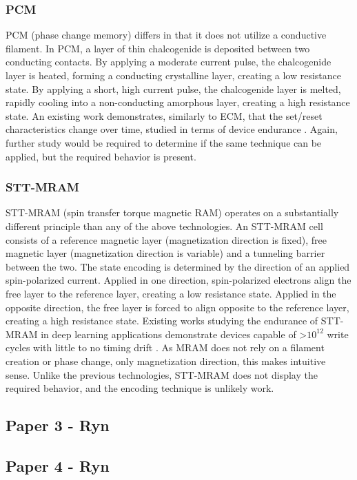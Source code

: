 \documentclass[sigconf,authoryear]{acmart}
\begin{document}
\subsubsection{PCM}
PCM (phase change memory) differs in that it does not utilize a conductive filament. In PCM, a layer of thin chalcogenide is deposited 
between two conducting contacts. By applying a moderate current pulse, the chalcogenide layer is heated, forming a conducting 
crystalline layer, creating a low resistance state. By applying a short, high current pulse, the chalcogenide layer is melted, 
rapidly cooling into a non-conducting amorphous layer, creating a high resistance state. An existing work demonstrates, similarly to ECM, 
that the set/reset characteristics change over time, studied in terms of device endurance \cite{PCM}. Again, further study would be 
required to determine if the same technique can be applied, but the required behavior is present.

\subsubsection{STT-MRAM}
STT-MRAM (spin transfer torque magnetic RAM) operates on a substantially different principle than any of the above technologies. 
An STT-MRAM cell consists of a reference magnetic layer (magnetization direction is fixed), free magnetic layer (magnetization direction 
is variable) and a tunneling barrier between the two. The state encoding is determined by the direction of an applied spin-polarized 
current. Applied in one direction, spin-polarized electrons align the free layer to the reference layer, creating a low resistance state. 
Applied in the opposite direction, the free layer is forced to align opposite to the reference layer, creating a high resistance state. 
Existing works studying the endurance of STT-MRAM in deep learning applications demonstrate devices capable of >$10^{12}$ write cycles 
with little to no timing drift \cite{MRAM}. As MRAM does not rely on a filament creation or phase change, only magnetization direction, 
this makes intuitive sense. Unlike the previous technologies, STT-MRAM does not display the required behavior, and the encoding technique 
is unlikely work.


\subsection{Paper 3 - Ryn}


\subsection{Paper 4 - Ryn } 
\end{document}
